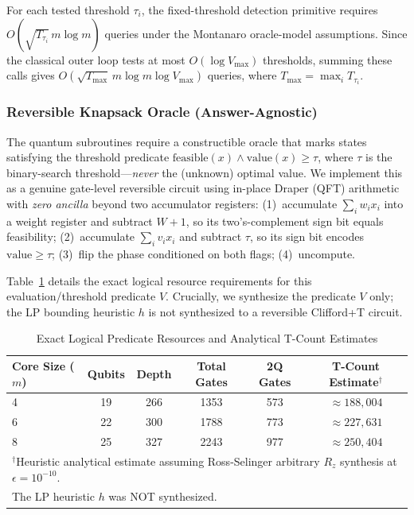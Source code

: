 \documentclass[conference]{IEEEtran} \IEEEoverridecommandlockouts
\begin{document}
For each tested threshold $\tau_i$, the fixed-threshold detection primitive requires $O(\sqrt{T_{\tau_i}}\,m\log m)$ queries under the Montanaro oracle-model assumptions. Since the classical outer loop tests at most $O(\log V_{\max})$ thresholds, summing these calls gives $O(\sqrt{T_{\max}}\,m\log m\log V_{\max})$ queries, where $T_{\max}=\max_i T_{\tau_i}$.

\subsubsection{Reversible Knapsack Oracle (Answer-Agnostic)}
\label{sec:oracle-impl}

The quantum subroutines require a constructible oracle that marks states satisfying the threshold predicate $\text{feasible}(x) \wedge \text{value}(x) \geq \tau$, where $\tau$ is the binary-search threshold---\textit{never} the (unknown) optimal value. We implement this as a genuine gate-level reversible circuit using in-place Draper (QFT) arithmetic with \textit{zero ancilla} beyond two accumulator registers: (1)~accumulate $\sum_i w_i x_i$ into a weight register and subtract $W{+}1$, so its two's-complement sign bit equals feasibility; (2)~accumulate $\sum_i v_i x_i$ and subtract $\tau$, so its sign bit encodes $\text{value} \geq \tau$; (3)~flip the phase conditioned on both flags; (4)~uncompute. 

Table~\ref{tab:oracle} details the exact logical resource requirements for this evaluation/threshold predicate $V$. Crucially, we synthesize the predicate $V$ only; the LP bounding heuristic $h$ is not synthesized to a reversible Clifford+T circuit. 

\begin{table}[htbp]
\caption{Exact Logical Predicate Resources and Analytical T-Count Estimates}
\label{tab:oracle}
\begin{center}
\footnotesize
\begin{tabular}{lccccc}
\toprule
\textbf{Core Size ($m$)} & \textbf{Qubits} & \textbf{Depth} & \textbf{Total Gates} & \textbf{2Q Gates} & \textbf{T-Count Estimate$^\dagger$} \\
\midrule
4 & 19 & 266 & 1353 & 573 & $\approx 188{,}004$ \\
6 & 22 & 300 & 1788 & 773 & $\approx 227{,}631$ \\
8 & 25 & 327 & 2243 & 977 & $\approx 250{,}404$ \\
\bottomrule
\multicolumn{6}{l}{\footnotesize $^\dagger$Heuristic analytical estimate assuming Ross-Selinger arbitrary $R_z$ synthesis at $\epsilon = 10^{-10}$.} \\
\multicolumn{6}{l}{\footnotesize The LP heuristic $h$ was NOT synthesized.}
\end{tabular}
\end{center}
\end{table}
\end{document}

